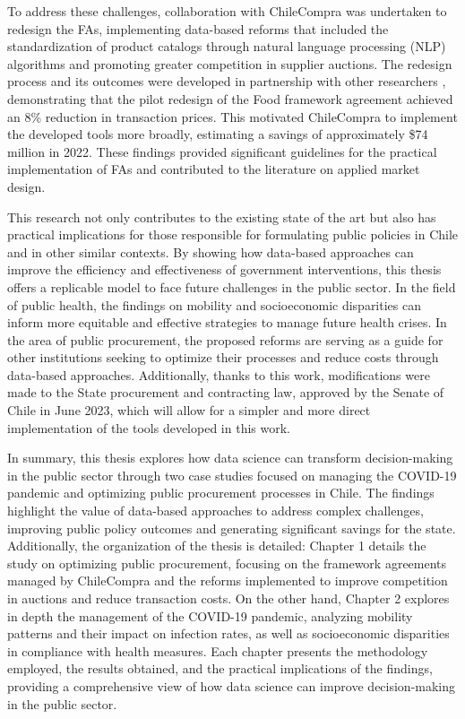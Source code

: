\begin{intro}
    To address these challenges, collaboration with ChileCompra was undertaken to redesign the FAs, implementing data-based reforms that included the standardization of product catalogs through natural language processing (NLP) algorithms and promoting greater competition in supplier auctions. The redesign process and its outcomes were developed in partnership with other researchers \cite{olivares2024saving}, demonstrating that the pilot redesign of the Food framework agreement achieved an 8\% reduction in transaction prices. This motivated ChileCompra to implement the developed tools more broadly, estimating a savings of approximately \$74 million in 2022. These findings provided significant guidelines for the practical implementation of FAs and contributed to the literature on applied market design.

    This research not only contributes to the existing state of the art but also has practical implications for those responsible for formulating public policies in Chile and in other similar contexts. By showing how data-based approaches can improve the efficiency and effectiveness of government interventions, this thesis offers a replicable model to face future challenges in the public sector. In the field of public health, the findings on mobility and socioeconomic disparities can inform more equitable and effective strategies to manage future health crises. In the area of public procurement, the proposed reforms are serving as a guide for other institutions seeking to optimize their processes and reduce costs through data-based approaches. Additionally, thanks to this work, modifications were made to the State procurement and contracting law, approved by the Senate of Chile in June 2023, which will allow for a simpler and more direct implementation of the tools developed in this work.
    
    In summary, this thesis explores how data science can transform decision-making in the public sector through two case studies focused on managing the COVID-19 pandemic and optimizing public procurement processes in Chile. The findings highlight the value of data-based approaches to address complex challenges, improving public policy outcomes and generating significant savings for the state. Additionally, the organization of the thesis is detailed: Chapter 1 details the study on optimizing public procurement, focusing on the framework agreements managed by ChileCompra and the reforms implemented to improve competition in auctions and reduce transaction costs. On the other hand, Chapter 2 explores in depth the management of the COVID-19 pandemic, analyzing mobility patterns and their impact on infection rates, as well as socioeconomic disparities in compliance with health measures. Each chapter presents the methodology employed, the results obtained, and the practical implications of the findings, providing a comprehensive view of how data science can improve decision-making in the public sector.
    
    
    
\end{intro}
